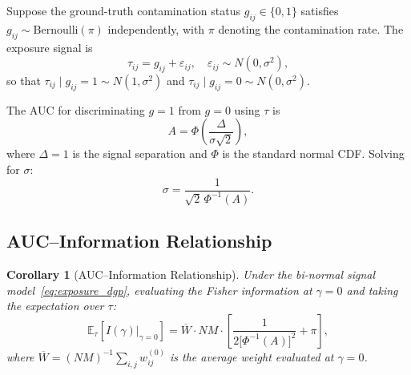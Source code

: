 \documentclass[11pt,a4paper]{article}
\newtheorem{corollary}[theorem]{Corollary}
\theoremstyle{definition}
\begin{document}
Suppose the ground-truth contamination status $g_{ij}\in\{0,1\}$ satisfies
$g_{ij}\sim\mathrm{Bernoulli}(\pi)$ independently,
with $\pi$ denoting the contamination rate.
The exposure signal is
\begin{equation}\label{eq:exposure_dgp}
  \tau_{ij} = g_{ij} + \varepsilon_{ij},
  \quad \varepsilon_{ij}\sim N(0,\sigma^2),
\end{equation}
so that
$\tau_{ij}\mid g_{ij}=1 \sim N(1,\sigma^2)$ and
$\tau_{ij}\mid g_{ij}=0 \sim N(0,\sigma^2)$.

The AUC for discriminating $g=1$ from $g=0$ using $\tau$ is
\begin{equation}\label{eq:auc_formula}
  A = \Phi\!\left(\frac{\Delta}{\sigma\sqrt{2}}\right),
\end{equation}
where $\Delta = 1$ is the signal separation and
$\Phi$ is the standard normal CDF.
Solving for $\sigma$:
\begin{equation}\label{eq:sigma_from_auc}
  \sigma
  = \frac{1}{\sqrt{2}\,\Phi^{-1}(A)}.
\end{equation}


\subsection{AUC--Information Relationship}

\begin{corollary}[AUC--Information Relationship]\label{cor:auc}
Under the bi-normal signal model~\eqref{eq:exposure_dgp},
evaluating the Fisher information at $\gamma=0$ and taking the
expectation over $\tau$:
\begin{equation}\label{eq:EI_auc}
  \mathbb{E}_\tau\!\left[I(\gamma)\big|_{\gamma=0}\right]
  = \overline{W}\cdot NM\cdot
    \left[\frac{1}{2\bigl[\Phi^{-1}(A)\bigr]^2} + \pi\right],
\end{equation}
where $\overline{W} = (NM)^{-1}\sum_{i,j}w_{ij}^{(0)}$ is the average weight
evaluated at $\gamma=0$.
\end{corollary}
\end{document}

